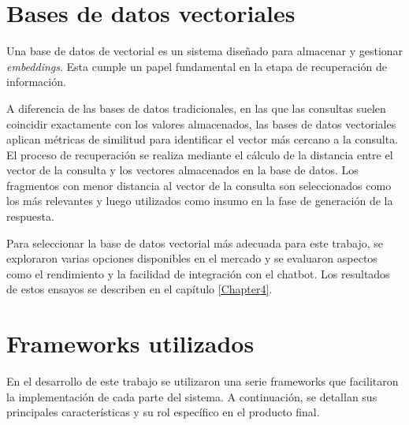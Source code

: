 \section{Bases de datos vectoriales}

Una base de datos de vectorial \citep{article:vector-db} es un sistema diseñado para almacenar y gestionar \textit{embeddings}. Esta
cumple un papel fundamental en la etapa de recuperación de información.

A diferencia de las bases de datos tradicionales, en las que las consultas suelen coincidir exactamente con los valores almacenados, 
las bases de datos vectoriales aplican métricas de similitud para identificar el vector más cercano a la consulta. 
El proceso de recuperación se realiza mediante el cálculo de la distancia entre 
el vector de la consulta y los vectores almacenados en la base de datos. Los fragmentos con menor distancia al vector 
de la consulta son seleccionados como los más relevantes y luego utilizados como insumo en la fase de generación de la respuesta. 

Para seleccionar la base de datos vectorial más adecuada para este trabajo, se exploraron varias opciones 
disponibles en el mercado y se evaluaron aspectos como el rendimiento y la facilidad de integración con el chatbot. 
Los resultados de estos ensayos se describen en el capítulo \ref{Chapter4}.

\section{Frameworks utilizados}

En el desarrollo de este trabajo se utilizaron una serie frameworks que facilitaron la implementación de 
cada parte del sistema. A continuación, se detallan sus principales características y su rol específico en el producto final.

